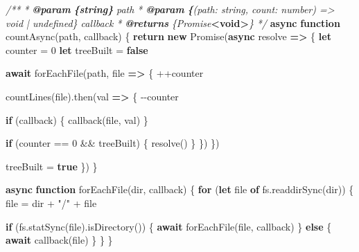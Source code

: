 \documentclass[11pt]{article}
\newenvironment{Shaded}{}{}
\newcommand{\KeywordTok}[1]{\textcolor[rgb]{0.00,0.44,0.13}{\textbf{{#1}}}}
\newcommand{\DecValTok}[1]{\textcolor[rgb]{0.25,0.63,0.44}{{#1}}}
\newcommand{\StringTok}[1]{\textcolor[rgb]{0.25,0.44,0.63}{{#1}}}
\newcommand{\CommentTok}[1]{\textcolor[rgb]{0.38,0.63,0.69}{\textit{{#1}}}}
\newcommand{\FunctionTok}[1]{\textcolor[rgb]{0.02,0.16,0.49}{{#1}}}
\newcommand{\NormalTok}[1]{{#1}}
\newcommand{\AnnotationTok}[1]{\textcolor[rgb]{0.38,0.63,0.69}{\textbf{\textit{{#1}}}}}
\newcommand{\CommentVarTok}[1]{\textcolor[rgb]{0.38,0.63,0.69}{\textbf{\textit{{#1}}}}}
\newcommand{\ControlFlowTok}[1]{\textcolor[rgb]{0.00,0.44,0.13}{\textbf{{#1}}}}
\newcommand{\OperatorTok}[1]{\textcolor[rgb]{0.40,0.40,0.40}{{#1}}}
\newcommand{\BuiltInTok}[1]{{#1}}
\begin{document}
\begin{Shaded}
\begin{Highlighting}[]
\CommentTok{/**}
\CommentTok{ * }\AnnotationTok{@param}\CommentTok{ }\CommentVarTok{\{string\}}\CommentTok{ path }
\CommentTok{ * }\AnnotationTok{@param}\CommentTok{ }\CommentVarTok{\{}\CommentTok{(path: string, count: number) =\textgreater{} void | undefined\} callback}
\CommentTok{ * }\AnnotationTok{@returns}\CommentTok{ \{Promise}\KeywordTok{\textless{}void\textgreater{}}\CommentTok{\} }
\CommentTok{ */}
\KeywordTok{async} \KeywordTok{function} \FunctionTok{countAsync}\NormalTok{(path}\OperatorTok{,}\NormalTok{ callback) \{}
    \ControlFlowTok{return} \KeywordTok{new} \BuiltInTok{Promise}\NormalTok{(}\KeywordTok{async}\NormalTok{ resolve }\KeywordTok{=\textgreater{}}\NormalTok{ \{}
        \KeywordTok{let}\NormalTok{ counter }\OperatorTok{=} \DecValTok{0}
        \KeywordTok{let}\NormalTok{ treeBuilt }\OperatorTok{=} \KeywordTok{false}

        \ControlFlowTok{await} \FunctionTok{forEachFile}\NormalTok{(path}\OperatorTok{,}\NormalTok{ file }\KeywordTok{=\textgreater{}}\NormalTok{ \{}
            \OperatorTok{++}\NormalTok{counter}

            \FunctionTok{countLines}\NormalTok{(file)}\OperatorTok{.}\FunctionTok{then}\NormalTok{(val }\KeywordTok{=\textgreater{}}\NormalTok{ \{}
                \OperatorTok{{-}{-}}\NormalTok{counter}

                \ControlFlowTok{if}\NormalTok{ (callback) \{}
                    \FunctionTok{callback}\NormalTok{(file}\OperatorTok{,}\NormalTok{ val)}
\NormalTok{                \}}

                \ControlFlowTok{if}\NormalTok{ (counter }\OperatorTok{==} \DecValTok{0} \OperatorTok{\&\&}\NormalTok{ treeBuilt) \{}
                    \FunctionTok{resolve}\NormalTok{()}
\NormalTok{                \}}
\NormalTok{            \})}
\NormalTok{        \})}

\NormalTok{        treeBuilt }\OperatorTok{=} \KeywordTok{true}
\NormalTok{    \})}
\NormalTok{\}}

\KeywordTok{async} \KeywordTok{function} \FunctionTok{forEachFile}\NormalTok{(dir}\OperatorTok{,}\NormalTok{ callback) \{}
    \ControlFlowTok{for}\NormalTok{ (}\KeywordTok{let}\NormalTok{ file }\KeywordTok{of}\NormalTok{ fs}\OperatorTok{.}\FunctionTok{readdirSync}\NormalTok{(dir)) \{}
\NormalTok{        file }\OperatorTok{=}\NormalTok{ dir }\OperatorTok{+} \StringTok{"/"} \OperatorTok{+}\NormalTok{ file}

        \ControlFlowTok{if}\NormalTok{ (fs}\OperatorTok{.}\FunctionTok{statSync}\NormalTok{(file)}\OperatorTok{.}\FunctionTok{isDirectory}\NormalTok{()) \{}
            \ControlFlowTok{await} \FunctionTok{forEachFile}\NormalTok{(file}\OperatorTok{,}\NormalTok{ callback)}
\NormalTok{        \} }\ControlFlowTok{else}\NormalTok{ \{}
            \ControlFlowTok{await} \FunctionTok{callback}\NormalTok{(file)}
\NormalTok{        \}}
\NormalTok{    \}}
\NormalTok{\}}


\end{Highlighting}
\end{Shaded}
\end{document}
